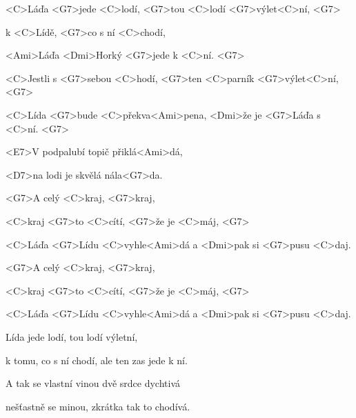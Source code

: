 
\zs
<C>Láďa <G7>jede <C>lodí, <G7>tou <C>lodí <G7>výlet<C>ní, <G7>

k <C>Lídě, <G7>co s ní <C>chodí,

<Ami>Láďa <Dmi>Horký <G7>jede k <C>ní. <G7>

<C>Jestli s <G7>sebou <C>hodí, <G7>ten <C>parník <G7>výlet<C>ní, <G7>

<C>Lída <G7>bude <C>překva<Ami>pena, <Dmi>že je <G7>Láďa s <C>ní. <G7>
\ks

\zr
<E7>V podpalubí topič přiklá<Ami>dá,

<D7>na lodi je skvělá nála<G7>da.

<G7>A celý <C>kraj, <G7>kraj,

<C>kraj <G7>to <C>cítí, <G7>že je <C>máj, <G7>

<C>Láďa <G7>Lídu <C>vyhle<Ami>dá a <Dmi>pak si <G7>pusu <C>daj.

<G7>A celý <C>kraj, <G7>kraj,

<C>kraj <G7>to <C>cítí, <G7>že je <C>máj, <G7>

<C>Láďa <G7>Lídu <C>vyhle<Ami>dá a <Dmi>pak si <G7>pusu <C>daj.
\kr

\zs
Lída jede lodí, tou lodí výletní,

k tomu, co s ní chodí, ale ten zas jede k ní.

A tak se vlastní vinou dvě srdce dychtivá

nešťastně se minou, zkrátka tak to chodívá.
\ks

\zr \kr

\kp
